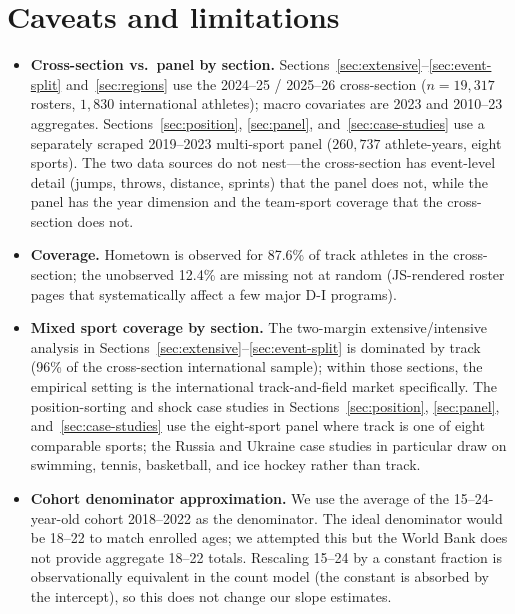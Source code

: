 \documentclass[11pt]{article}
\begin{document}
\section{Caveats and limitations}

\begin{itemize}
\item \textbf{Cross-section vs.\ panel by section.}
Sections~\ref{sec:extensive}--\ref{sec:event-split} and~\ref{sec:regions}
use the 2024--25 / 2025--26 cross-section ($n=19{,}317$ rosters,
$1{,}830$ international athletes); macro covariates are 2023 and
2010--23 aggregates.
Sections~\ref{sec:position}, \ref{sec:panel}, and~\ref{sec:case-studies}
use a separately scraped 2019--2023 multi-sport panel
($260{,}737$ athlete-years, eight sports). The two data sources do not nest---the cross-section has
event-level detail (jumps, throws, distance, sprints) that the
panel does not, while the panel has the year dimension and the
team-sport coverage that the cross-section does not.

\item \textbf{Coverage.} Hometown is observed for 87.6\% of track
athletes in the cross-section; the unobserved 12.4\% are missing
not at random (JS-rendered roster pages that systematically affect
a few major D-I programs).

\item \textbf{Mixed sport coverage by section.} The two-margin
extensive/intensive analysis in
Sections~\ref{sec:extensive}--\ref{sec:event-split} is dominated by
track (96\% of the cross-section international sample); within
those sections, the empirical setting is the international
track-and-field market specifically. The position-sorting and
shock case studies in
Sections~\ref{sec:position}, \ref{sec:panel}, and~\ref{sec:case-studies}
use the eight-sport panel where track is one of eight comparable
sports; the Russia and Ukraine case studies in particular draw on
swimming, tennis, basketball, and ice hockey rather than track.

\item \textbf{Cohort denominator approximation.} We use the average
of the 15--24-year-old cohort 2018--2022 as the denominator. The
ideal denominator would be 18--22 to match enrolled ages; we
attempted this but the World Bank does not provide aggregate
18--22 totals. Rescaling 15--24 by a constant fraction is
observationally equivalent in the count model (the constant is
absorbed by the intercept), so this does not change our slope
estimates.


\end{itemize}
\end{document}

